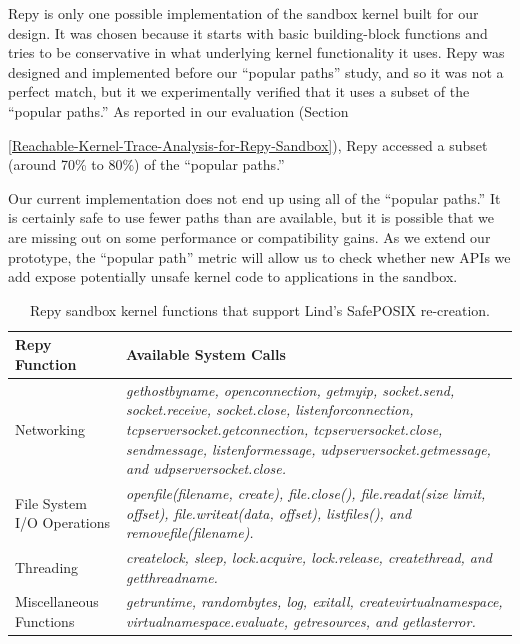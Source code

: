 Repy is only one possible implementation of the sandbox kernel built for our \lip design.
It was chosen because it starts with basic building-block functions and tries to be conservative in what underlying kernel functionality it uses.
Repy was designed and implemented before our ``popular paths'' study, and so it was not a perfect match,
but it we experimentally verified that it uses a subset of the ``popular paths.''
As reported in our evaluation (Section~{{\ref{Reachable-Kernel-Trace-Analysis-for-Repy-Sandbox}}),
Repy accessed a subset (around 70\% to 80\%) of the ``popular paths.''

Our current implementation does not end up using all of the ``popular paths.''
It is certainly safe to use fewer paths than are available, but it is possible
that we are missing out on some performance or compatibility gains.
As we extend our prototype, the ``popular path'' metric will allow us to check
whether new APIs we add
expose potentially unsafe kernel code to applications in the sandbox.

\begin{table}
\centering
  \begin{tabular}{ | p{2.5cm} | p{4.5cm} |}
  \hline
  \textbf{Repy Function} & \textbf{Available System Calls}  \\ \hline

Networking & \emph{gethostbyname, openconnection, getmyip, socket.send, socket.receive, socket.close,
listenforconnection, tcpserversocket.getconnection, tcpserversocket.close, sendmessage, listenformessage,
udpserversocket.getmessage, and udpserversocket.close.} \\ \hline

File System I/O Operations & \emph{openfile(filename, create), file.close(), file.readat(size limit, offset), file.writeat(data, offset),
listfiles(), and removefile(filename).} \\ \hline

Threading & \emph{createlock, sleep, lock.acquire, lock.release, createthread, and getthreadname.} \\ \hline

Miscellaneous Functions & \emph{getruntime, randombytes, log, exitall, createvirtualnamespace,
virtualnamespace.evaluate, getresources, and getlasterror.}  \\ \hline
    \end{tabular}
    \caption{Repy sandbox kernel functions that support Lind's SafePOSIX re-creation.}
    \label{table:RepyKernel}
\end{table}


}

